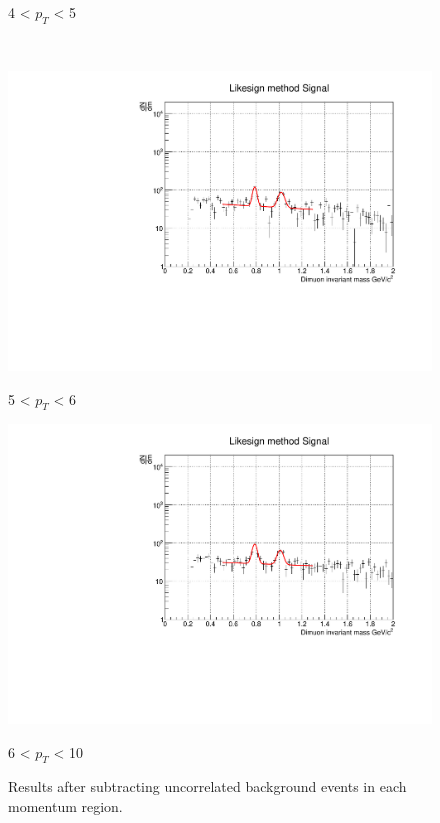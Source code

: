 \begin{figure}[htbp]
\begin{minipage}{0.45\textwidth}
                        \captionsetup{labelformat=empty}
                        \caption{4 < $p_{T}$ < 5} 
                        \label{Analysis:Dimuon:Yield:fit_4to5}
                    \end{minipage}
                    \\
                    \vspace{1em}
                    \begin{minipage}{0.45\textwidth}
                        \centering
                        \includegraphics[width=\textwidth]{fig/3_4_2_fit_pt_5to6.pdf}
                        \captionsetup{labelformat=empty}
                        \caption{5 < $p_{T}$ < 6}
                        \label{Analysis:Dimuon:Yield:fit_5to6}
                    \end{minipage}
                    \hfill
                    \begin{minipage}{0.45\textwidth}
                        \centering
                        \includegraphics[width=\textwidth]{fig/3_4_2_fit_pt_6to10.pdf}
                        \captionsetup{labelformat=empty}
                        \caption{6 < $p_{T}$ < 10}
                        \label{Analysis:Dimuon:Yield:fit_6to10}
                    \end{minipage}
                    \caption{Results after subtracting uncorrelated background events in each momentum region.}
                \end{figure}
